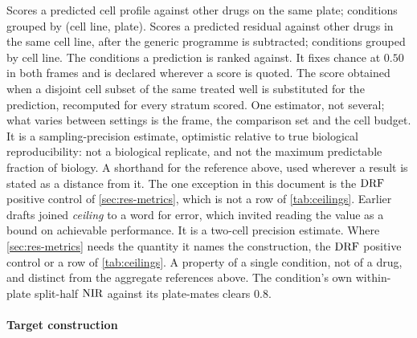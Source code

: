 \begin{description}[leftmargin=1em, itemsep=0.5ex,
                    font=\normalfont\bfseries]
 Scores a predicted cell profile against
  other drugs on the same plate; conditions grouped by (cell line, plate).
 Scores a predicted residual against other
  drugs in the same cell line, after the generic programme is subtracted;
  conditions grouped by cell line.
 The conditions a prediction is ranked
  against. It fixes chance at $0.50$ in both frames and is declared wherever a
  score is quoted.
 The score
  obtained when a disjoint cell subset of the same treated well is substituted
  for the prediction, recomputed for every stratum scored. One estimator, not
  several; what varies between settings is the frame, the comparison set and the
  cell budget. It is a sampling-precision estimate, optimistic relative to true
  biological reproducibility: not a biological replicate, and not the maximum
  predictable fraction of biology.
 A shorthand for the reference above, used wherever a
  result is stated as a distance from it. The one exception in this document is
  the $\textrm{DRF}$ positive control of \cref{sec:res-metrics}, which is not a row of
  \cref{tab:ceilings}.
 Earlier drafts joined
  \emph{ceiling} to a word for error, which invited reading the value as a
  bound on achievable performance. It is a two-cell precision estimate. Where
  \cref{sec:res-metrics} needs the quantity it names the construction, the
  $\textrm{DRF}$ positive control or a row of \cref{tab:ceilings}.
 A property of a single condition, not
  of a drug, and distinct from the aggregate references above. The
  condition's own within-plate split-half $\textrm{NIR}$ against its plate-mates clears
  $0.8$.
\end{description}

\paragraph{Target construction}

